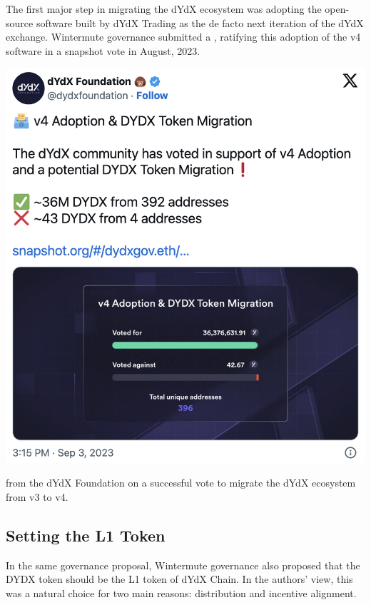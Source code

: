         The first major step in migrating the dYdX ecosystem was adopting the open-source software built by dYdX Trading as the de facto next iteration of the dYdX exchange. Wintermute governance submitted a , ratifying this adoption of the v4 software in a snapshot vote in August, 2023.

        \begin{marginfigure}
            \centering
            \includegraphics[width=\linewidth]{figs/migration_tweet.png}
            \caption{ from the dYdX Foundation on a successful vote to migrate the dYdX ecosystem from v3 to v4.}
            \label{fig:migration_tweet}
        \end{marginfigure}

    \subsection{Setting the L1 Token} \label{subsec:l1token}

        In the same governance proposal, Wintermute governance also proposed that the DYDX token should be the L1 token of dYdX Chain. In the authors' view, this was a natural choice for two main reasons: distribution and incentive alignment.

